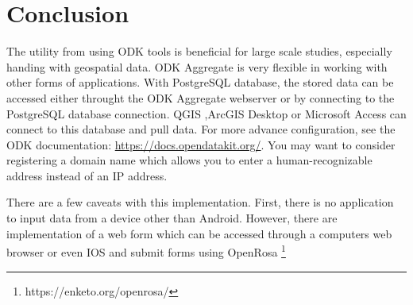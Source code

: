 \section*{Conclusion}

The utility from using ODK tools is beneficial for large scale studies, especially handing with geospatial data. ODK Aggregate is very flexible in working with other forms of applications. With PostgreSQL database, the stored data can be accessed either throught the ODK Aggregate webserver or by connecting to the PostgreSQL database connection. QGIS ,ArcGIS Desktop or Microsoft Access can connect to this database and pull data. For more advance configuration, see the ODK documentation: \url{https://docs.opendatakit.org/}. You may want to consider registering a domain name which allows you to enter a human-recognizable address instead of an IP address.

There are a few caveats with this implementation. First, there is no application to input data from a device other than Android. However, there are implementation of a web form which can be accessed through a computers web browser or even IOS and submit forms using OpenRosa \footnote{https://enketo.org/openrosa/}
